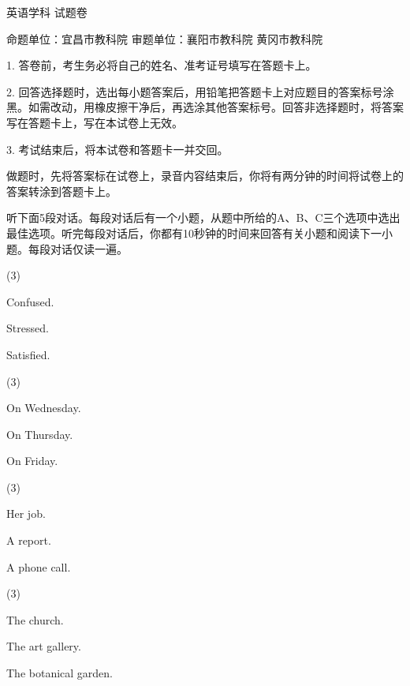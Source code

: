 \documentclass{英语试卷}
\begin{document}
\par 英语学科 试题卷\par
\par 命题单位：宜昌市教科院 审题单位：襄阳市教科院 黄冈市教科院\par
\begin{notice}
\par 1. 答卷前，考生务必将自己的姓名、准考证号填写在答题卡上。\par
\par 2. 回答选择题时，选出每小题答案后，用铅笔把答题卡上对应题目的答案标号涂黑。如需改动，用橡皮擦干净后，再选涂其他答案标号。回答非选择题时，将答案写在答题卡上，写在本试卷上无效。\par
\par 3. 考试结束后，将本试卷和答题卡一并交回。\par
\end{notice}
\par 做题时，先将答案标在试卷上，录音内容结束后，你将有两分钟的时间将试卷上的答案转涂到答题卡上。\par
{}
\par 听下面5段对话。每段对话后有一个小题，从题中所给的A、B、C三个选项中选出最佳选项。听完每段对话后，你都有10秒钟的时间来回答有关小题和阅读下一小题。每段对话仅读一遍。\par
{}
\begin{choices}(3)
  \item Confused.
  \item Stressed.
  \item Satisfied.
\end{choices}
\begin{choices}(3)
  \item On Wednesday.
  \item On Thursday.
  \item On Friday.
\end{choices}
\begin{choices}(3)
  \item Her job.
  \item A report.
  \item A phone call.
\end{choices}
\begin{choices}(3)
  \item The church.
  \item The art gallery.
  \item The botanical garden.
\end{choices}
\end{document}
